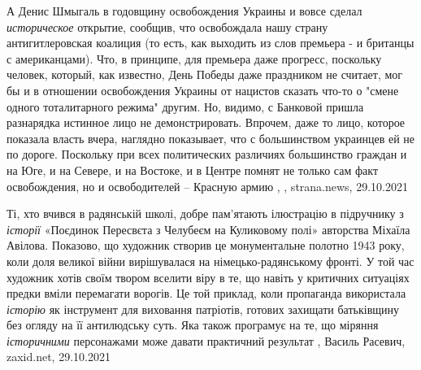 А Денис Шмыгаль в годовщину освобождения Украины и вовсе сделал
\emph{историческое} открытие, сообщив, что освобождала нашу страну
антигитлеровская коалиция (то есть, как выходить из слов премьера - и британцы
с американцами). Что, в принципе, для премьера даже прогресс, поскольку
человек, который, как известно, День Победы даже праздником не считает, мог бы
и в отношении освобождения Украины от нацистов сказать что-то о "смене одного
тоталитарного режима" другим. Но, видимо, с Банковой пришла разнарядка истинное
лицо не демонстрировать.  Впрочем, даже то лицо, которое показала власть вчера,
наглядно показывает, что с большинством украинцев ей не по дороге. Поскольку
при всех политических различиях большинство граждан и на Юге, и на Севере, и на
Востоке, и в Центре помнят не только сам факт освобождения, но и освободителей
– Красную армию
, 
, strana.news, 29.10.2021

Ті, хто вчився в радянській школі, добре пам’ятають ілюстрацію в підручнику з
\emph{історії} «Поєдинок Пересвєта з Челубеєм на Куликовому полі» авторства Міхаїла
Авілова. Показово, що художник створив це монументальне полотно 1943 року, коли
доля великої війни вирішувалася на німецько-радянському фронті. У той час
художник хотів своїм твором вселити віру в те, що навіть у критичних ситуаціях
предки вміли перемагати ворогів. Це той приклад, коли пропаганда використала
\emph{історію} як інструмент для виховання патріотів, готових захищати батьківщину без
огляду на її антилюдську суть. Яка також програмує на те, що міряння
\emph{історичними} персонажами може давати практичний результат
, 
Василь Расевич, zaxid.net, 29.10.2021

